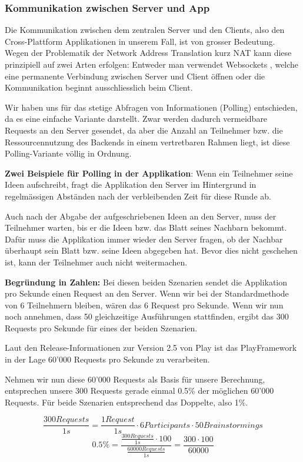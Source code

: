 \subsubsection{Kommunikation zwischen Server und App}
Die Kommunikation zwischen dem zentralen Server und den Clients, also den Cross-Plattform Applikationen in unserem Fall, ist von grosser Bedeutung. Wegen der Problematik der Network Address Translation kurz NAT \cite{NAT} kann diese prinzipiell auf zwei Arten erfolgen: Entweder man verwendet Websockets \cite{WebSockets}, welche eine permanente Verbindung zwischen Server und Client öffnen oder die Kommunikation beginnt ausschliesslich beim Client. 


Wir haben uns für das stetige Abfragen von Informationen (Polling) entschieden, da es eine einfache Variante darstellt. Zwar werden dadurch vermeidbare Requests an den Server gesendet, da aber die Anzahl an Teilnehmer bzw. die Ressourcennutzung des Backends in einem vertretbaren Rahmen liegt, ist diese Polling-Variante völlig in Ordnung.  

\textbf{Zwei Beispiele für Polling in der Applikation}: Wenn ein Teilnehmer seine Ideen aufschreibt, fragt die Applikation den Server im Hintergrund in regelmässigen Abständen nach der verbleibenden Zeit für diese Runde ab.


Auch nach der Abgabe der aufgeschriebenen Ideen an den Server, muss der Teilnehmer warten, bis er die Ideen bzw. das Blatt seines Nachbarn bekommt. Dafür muss die Applikation immer wieder den Server fragen, ob der Nachbar überhaupt sein Blatt bzw. seine Ideen abgegeben hat. Bevor dies nicht geschehen ist, kann der Teilnehmer auch nicht weitermachen.


\textbf{Begründung in Zahlen:}
Bei diesen beiden Szenarien sendet die Applikation pro Sekunde einen Request an den Server. Wenn wir bei der Standardmethode von 6 Teilnehmern bleiben, wären das 6 Request pro Sekunde. Wenn wir nun noch annehmen, dass 50 gleichzeitige Ausführungen stattfinden, ergibt das 300 Requests pro Sekunde für eines der beiden Szenarien.


Laut den Release-Informationen zur Version 2.5 von Play \cite{Play25} ist das PlayFramework in der Lage 60'000 Requests pro Sekunde zu verarbeiten.


Nehmen wir nun diese 60'000 Requests als Basis für unsere Berechnung, entsprechen unsere 300 Requests gerade einmal 0.5\% der möglichen 60'000 Requests. Für beide Szenarien entsprechend das Doppelte, also 1\%.

\[\frac{300Requests}{1s}=\frac{1Request}{1s}\cdot6Participants \cdot50Brainstormings\]
\[0.5\%= \frac{\frac{300Requests}{1s} \cdot 100}{\frac{60000Requests}{1s}} = \frac{300 \cdot 100}{60000}\]

